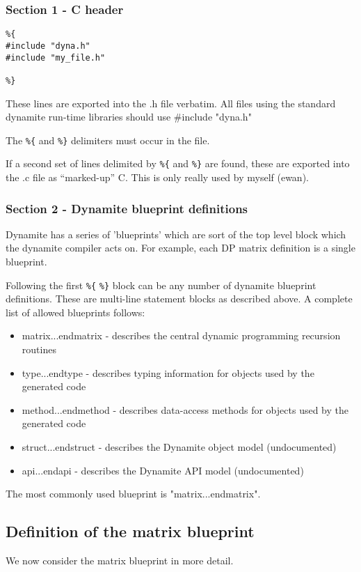 \subsubsection{Section 1 - C header}
\begin{verbatim}
%{
#include "dyna.h"
#include "my_file.h"

%} 
\end{verbatim} 


These lines are exported into the .h file verbatim. 
All files using the standard dynamite run-time libraries
should use \#include "dyna.h"

The {\tt \%\{} and {\tt \%\}} delimiters must occur in the file.

If a second set of lines delimited by {\tt \%\{} and {\tt \%\}} are found,
these are exported into the .c file as ``marked-up'' C. This is only
really used by myself (ewan).

\subsubsection{Section 2 - Dynamite blueprint definitions}
Dynamite has a series of 'blueprints' which are
sort of the top level block which the dynamite compiler acts on. 
For example, each DP matrix definition is a single blueprint. 

Following the first {\tt \%\{} {\tt \%\}} block can be any number of dynamite
blueprint definitions. These are multi-line statement blocks
as described above. A complete list of allowed blueprints follows:

\begin{itemize}
\item matrix...endmatrix - describes the central dynamic programming recursion routines
\item type...endtype - describes typing information for objects used by the generated code
\item method...endmethod - describes data-access methods for objects used by the generated code
\item struct...endstruct - describes the Dynamite object model (undocumented)
\item api...endapi - describes the Dynamite API model (undocumented)
\end{itemize}

The most commonly used blueprint is "matrix...endmatrix".

\subsection{Definition of the matrix blueprint}
We now consider the matrix blueprint in more detail.

